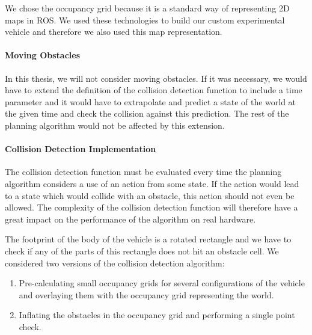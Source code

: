 We chose the occupancy grid because it is a standard way of representing 2D maps in \gls{ROS}. We used these technologies to build our custom experimental vehicle and therefore we also used this map representation.

\paragraph{Moving Obstacles}
In this thesis, we will not consider moving obstacles. If it was necessary, we would have to extend the definition of the collision detection function to include a time parameter and it would have to extrapolate and predict a state of the world at the given time and check the collision against this prediction. The rest of the planning algorithm would not be affected by this extension.

\paragraph{Collision Detection Implementation}
The collision detection function must be evaluated every time the planning algorithm considers a use of an action from some state. If the action would lead to a state which would collide with an obstacle, this action should not even be allowed. The complexity of the collision detection function will therefore have a great impact on the performance of the algorithm on real hardware.

The footprint of the body of the vehicle is a rotated rectangle and we have to check if any of the parts of this rectangle does not hit an obstacle cell. We considered two versions of the collision detection algorithm:
\begin{enumerate}
	\item Pre-calculating small occupancy grids for several configurations of the vehicle and overlaying them with the occupancy grid representing the world.
	\item Inflating the obstacles in the occupancy grid and performing a single point check.
\end{enumerate}


